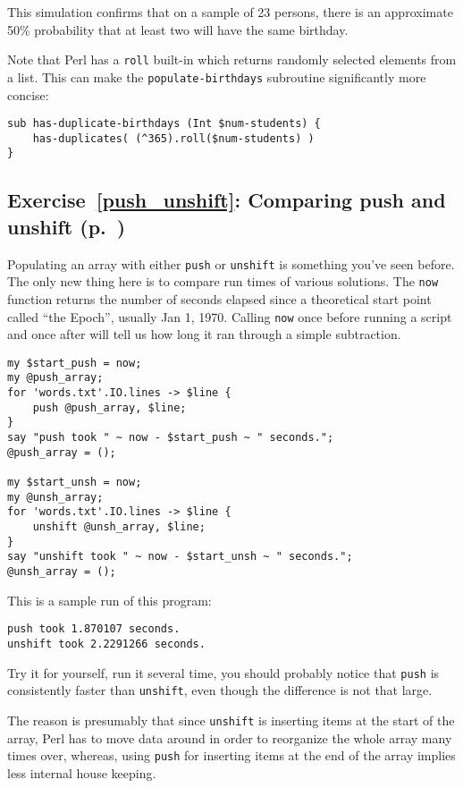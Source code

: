 This simulation confirms that on a sample of 23 persons, 
there is an approximate 50\% probability that at least 
two will have the same birthday.

Note that Perl has a {\tt roll} built-in which returns 
randomly selected elements from a list. This can make 
the {\tt populate-birthdays} subroutine significantly 
more concise:

\begin{verbatim}
sub has-duplicate-birthdays (Int $num-students) {
    has-duplicates( (^365).roll($num-students) )
}
\end{verbatim}

\subsection{Exercise~\ref{push_unshift}: Comparing push and unshift (p.~\pageref{push_unshift})}
\label{sol_push_unshift}

Populating an array with either {\tt push} or 
{\tt unshift} is something you've seen before. The only new thing 
here is to compare run times of various solutions.
The {\tt now} function returns the number of seconds 
elapsed since a theoretical start point called ``the 
Epoch'', usually Jan 1, 1970. Calling {\tt now} once 
before running a script and once after will tell 
us how long it ran through a simple subtraction.

\begin{verbatim}
my $start_push = now;
my @push_array;
for 'words.txt'.IO.lines -> $line {
    push @push_array, $line;
}
say "push took " ~ now - $start_push ~ " seconds.";
@push_array = ();

my $start_unsh = now;
my @unsh_array;
for 'words.txt'.IO.lines -> $line {
    unshift @unsh_array, $line;
}
say "unshift took " ~ now - $start_unsh ~ " seconds.";
@unsh_array = ();
\end{verbatim}

This is a sample run of this program:
\begin{verbatim}
push took 1.870107 seconds.
unshift took 2.2291266 seconds.
\end{verbatim}

Try it for yourself, run it several time, you should 
probably notice that {\tt push} is consistently 
faster than {\tt unshift}, even though the difference 
is not that large.

The reason is presumably that since {\tt unshift} is 
inserting items at the start of the array, Perl has 
to move data around in order to reorganize the whole 
array many times over, whereas, using {\tt push} 
for inserting items at the end of the array implies 
less internal house keeping.

